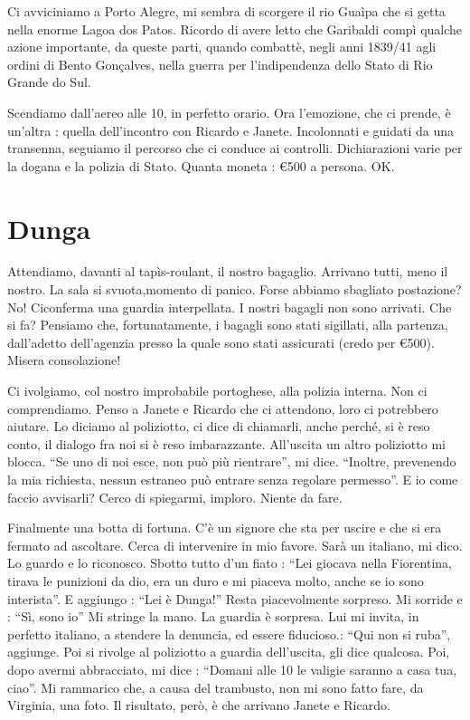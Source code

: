 \documentclass[a4paper,10pt]{book}
\begin{document}
Ci avviciniamo a Porto Alegre, mi sembra di scorgere il rio Guaìpa che si getta nella enorme Lagoa dos Patos. Ricordo di avere letto che Garibaldi compì qualche azione importante, da queste parti, quando combattè, negli anni 1839/41 agli ordini di Bento Gonçalves, nella guerra per l’indipendenza dello Stato di Rio Grande do Sul.

Scendiamo dall’aereo alle 10, in perfetto orario. Ora l’emozione, che ci prende, è un’altra : quella dell’incontro con Ricardo e Janete.
Incolonnati e guidati da una transenna, seguiamo il percorso che ci conduce ai controlli. Dichiarazioni varie per la dogana e la polizia di Stato. Quanta moneta : \euro 500 a persona. OK.

\section{Dunga}

Attendiamo, davanti al tapìs-roulant, il nostro bagaglio. Arrivano tutti, meno il nostro. La sala si svuota,momento di panico. Forse abbiamo sbagliato postazione? No! Ciconferma una guardia interpellata. I nostri bagagli non sono arrivati. Che si fa? Pensiamo che, fortunatamente, i bagagli sono stati sigillati, alla partenza, dall’adetto dell’agenzia presso la quale sono stati assicurati (credo per \euro 500). Misera consolazione!

Ci ivolgiamo, col nostro improbabile portoghese, alla polizia interna. Non ci comprendiamo.
Penso a Janete e Ricardo che ci attendono, loro ci potrebbero aiutare. Lo diciamo al poliziotto, ci dice di chiamarli, anche perché, si è reso conto, il dialogo fra noi si è reso imbarazzante. 
All’uscita un altro poliziotto mi blocca. “Se uno di noi esce, non può più rientrare”, mi dice. “Inoltre, prevenendo la mia richiesta, nessun estraneo può entrare senza regolare permesso”. E io come faccio avvisarli? Cerco di spiegarmi, imploro. Niente da fare. 

Finalmente una botta di fortuna. C’è un signore che sta per uscire e che si era fermato ad ascoltare. Cerca di intervenire in mio favore. Sarà un italiano, mi dico. Lo guardo e lo  riconosco. Sbotto tutto d’un fiato : “Lei giocava nella Fiorentina, tirava le punizioni da dio, era un duro e mi piaceva molto, anche se io sono interista”. E aggiungo : “Lei è Dunga!” Resta piacevolmente sorpreso. Mi sorride e : “Sì, sono io” Mi stringe la mano. La guardia è sorpresa. 
Lui mi invita, in perfetto italiano, a stendere la denuncia, ed essere fiducioso.: “Qui non si ruba”, aggiunge. Poi si rivolge al poliziotto a guardia dell’uscita, gli dice qualcosa. Poi, dopo avermi abbracciato, mi dice : “Domani alle 10 le valigie saranno a casa tua, ciao”.
Mi rammarico che, a causa del trambusto, non mi sono fatto fare, da Virginia, una foto.
Il risultato, però, è che arrivano Janete e Ricardo.
\end{document}

